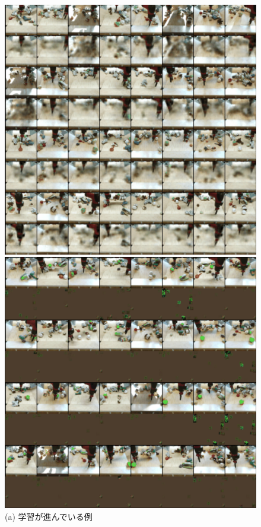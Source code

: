 \begin{figure}[tp]
  \begin{minipage}{0.48\hsize}
    \begin{center}
      \includegraphics[width=\linewidth]{./figures/dssm_64.png}
      \caption{(a) 学習が進んでいる例}
    \end{center}
  \end{minipage}
  \begin{minipage}{0.48\hsize}
    \begin{center}
      \includegraphics[width=\linewidth]{./figures/dssm_1024.png}

\end{center}
\end{minipage}
\end{figure}
